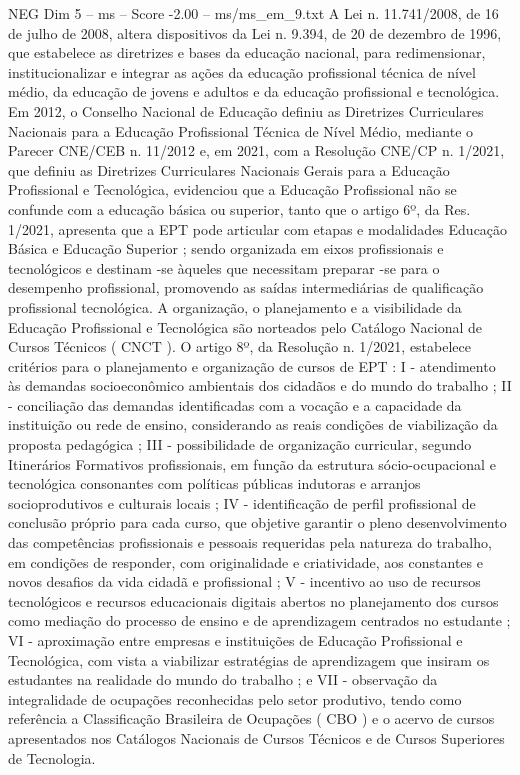 \begin{textsample}{NEG Dim 5 – ms – Score -2.00 – ms/ms\_em\_9.txt}
A Lei n. 11.741/2008, de 16 de julho de 2008, altera dispositivos da Lei n. 9.394, de 20 de dezembro de 1996, que estabelece as diretrizes e bases da educação nacional, para redimensionar, institucionalizar e integrar as ações da educação profissional técnica de nível médio, da educação de jovens e adultos e da educação profissional e tecnológica.
Em 2012, o Conselho Nacional de Educação definiu as Diretrizes Curriculares Nacionais para a Educação Profissional Técnica de Nível Médio, mediante o Parecer CNE/CEB n. 11/2012 e, em 2021, com a Resolução CNE/CP n. 1/2021, que definiu as Diretrizes Curriculares Nacionais Gerais para a Educação Profissional e Tecnológica, evidenciou que a Educação Profissional não se confunde com a educação básica ou superior, tanto que o artigo 6º, da Res. 1/2021, apresenta que a EPT pode articular com etapas e modalidades Educação Básica e Educação Superior ; sendo organizada em eixos profissionais e tecnológicos e destinam -se àqueles que necessitam preparar -se para o desempenho profissional, promovendo as saídas intermediárias de qualificação profissional tecnológica.
A organização, o planejamento e a visibilidade da Educação Profissional e Tecnológica são norteados pelo Catálogo Nacional de Cursos Técnicos ( CNCT ).
O artigo 8º, da Resolução n. 1/2021, estabelece critérios para o planejamento e organização de cursos de EPT : I - atendimento às demandas socioeconômico ambientais dos cidadãos e do mundo do trabalho ; II - conciliação das demandas identificadas com a vocação e a capacidade da instituição ou rede de ensino, considerando as reais condições de viabilização da proposta pedagógica ; III - possibilidade de organização curricular, segundo Itinerários Formativos profissionais, em função da estrutura sócio-ocupacional e tecnológica consonantes com políticas públicas indutoras e arranjos socioprodutivos e culturais locais ; IV - identificação de perfil profissional de conclusão próprio para cada curso, que objetive garantir o pleno desenvolvimento das competências profissionais e pessoais requeridas pela natureza do trabalho, em condições de responder, com originalidade e criatividade, aos constantes e novos desafios da vida cidadã e profissional ; V - incentivo ao uso de recursos tecnológicos e recursos educacionais digitais abertos no planejamento dos cursos como mediação do processo de ensino e de aprendizagem centrados no estudante ; VI - aproximação entre empresas e instituições de Educação Profissional e Tecnológica, com vista a viabilizar estratégias de aprendizagem que insiram os estudantes na realidade do mundo do trabalho ; e VII - observação da integralidade de ocupações reconhecidas pelo setor produtivo, tendo como referência a Classificação Brasileira de Ocupações ( CBO ) e o acervo de cursos apresentados nos Catálogos Nacionais de Cursos Técnicos e de Cursos Superiores de Tecnologia.

\end{textsample}
